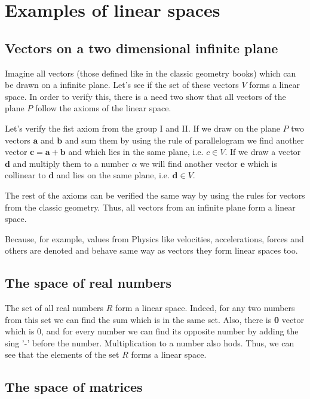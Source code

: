 \documentclass{book}
\begin{document}
\section{Examples of linear spaces}

\subsection{Vectors on a two dimensional infinite plane}

Imagine all vectors (those defined like in the classic geometry books) which can be drawn on a infinite plane. Let's see if the set of these vectors $V$ forms a linear space. In order to verify this, there is a need two show that all vectors of the plane $P$ follow the axioms of the linear space.

Let's verify the fist axiom from the group I and II. If we draw on the plane $P$ two vectors $\textbf{a}$ and $\textbf{b}$ and sum them by using the rule of parallelogram we find another vector $\textbf{c} = \textbf{a} + \textbf{b}$ and which lies in the same plane, i.e. $c \in V$. If we draw a vector $\textbf{d}$ and multiply them to a number $\alpha$ we will find another vector $\textbf{e}$ which is collinear to $\textbf{d}$ and lies on the same plane, i.e. $\textbf{d} \in V$.

The rest of the axioms can be verified the same way by using the rules for vectors from the classic geometry. Thus, all vectors from an infinite plane form a linear space.

Because, for example, values from Physics like velocities, accelerations, forces and others are denoted and behave same way as vectors they form linear spaces too.

\subsection{The space of real numbers}

The set of all real numbers $R$ form a linear space. Indeed, for any two numbers from this set we can find the sum which is in the same set. Also, there is \textbf{0} vector which is 0, and for every number we can find its opposite number by adding the sing '-' before the number. Multiplication to a number also hods. Thus, we can see that the elements of the set $R$ forms a linear space.

\subsection{The space of matrices}
\end{document}
